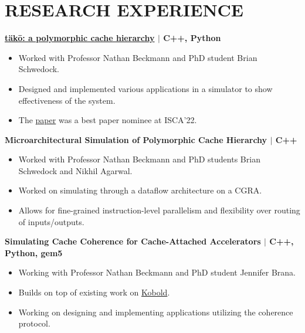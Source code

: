 \documentclass[10pt]{article}
\begin{document}
  \section*{\large \textcolor{lighterB}{RESEARCH EXPERIENCE}}
  \vspace*{-0.23cm}

  \textbf{\large \href{https://dl.acm.org/doi/10.1145/3470496.3527379}{täkō: a polymorphic cache hierarchy} $\mid$ C++, Python} 
  \vspace*{-0.17cm}
  \begin{itemize}
    \itemsep0em
    \item \textcolor{lighterG}{Worked with Professor Nathan Beckmann and PhD student Brian Schwedock.}
    \item \textcolor{lighterG}{Designed and implemented various applications in a simulator to show effectiveness of the system.}
    \item \textcolor{lighterG}{The \href{https://dl.acm.org/doi/10.1145/3470496.3527379}{paper} was a best paper nominee at ISCA'22.}
  \end{itemize}

  \textbf{\large {Microarchitectural Simulation of Polymorphic Cache Hierarchy} $\mid$ C++} 
  \vspace*{-0.17cm}
  \begin{itemize}
    \itemsep0em
    \item \textcolor{lighterG}{Worked with Professor Nathan Beckmann and PhD students Brian Schwedock and Nikhil Agarwal.}
    \item \textcolor{lighterG}{Worked on simulating through a dataflow architecture on a CGRA.}
    \item \textcolor{lighterG}{Allows for fine-grained instruction-level parallelism and flexibility over routing of inputs/outputs.}
  \end{itemize}

  \textbf{\large {Simulating Cache Coherence for Cache-Attached Accelerators} $\mid$ C++, Python, gem5} 
  \vspace*{-0.17cm}
  \begin{itemize}
    \itemsep0em
    \item \textcolor{lighterG}{Working with Professor Nathan Beckmann and PhD student Jennifer Brana.}
    \item \textcolor{lighterG}{Builds on top of existing work on \href{https://ieeexplore.ieee.org/document/10106564}{Kobold}.}
    \item \textcolor{lighterG}{Working on designing and implementing applications utilizing the coherence protocol.}
  \end{itemize}
\end{document}
